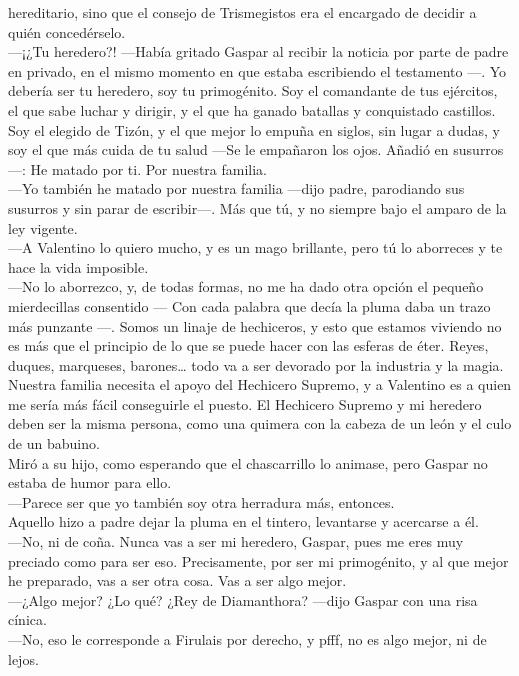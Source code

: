 \documentclass[
  letterpaper,
]{krantz}
\begin{document}
hereditario, sino que el consejo de Trismegistos era el encargado de
decidir a quién concedérselo.\\
---¡¿Tu heredero?! ---Había gritado Gaspar al recibir la noticia por
parte de padre en privado, en el mismo momento en que estaba escribiendo
el testamento ---. Yo debería ser tu heredero, soy tu primogénito. Soy
el comandante de tus ejércitos, el que sabe luchar y dirigir, y el que
ha ganado batallas y conquistado castillos. Soy el elegido de Tizón, y
el que mejor lo empuña en siglos, sin lugar a dudas, y soy el que más
cuida de tu salud ---Se le empañaron los ojos. Añadió en susurros ---:
He matado por ti. Por nuestra familia.\\
---Yo también he matado por nuestra familia ---dijo padre, parodiando
sus susurros y sin parar de escribir---. Más que tú, y no siempre bajo
el amparo de la ley vigente.\\
---A Valentino lo quiero mucho, y es un mago brillante, pero tú lo
aborreces y te hace la vida imposible.\\
---No lo aborrezco, y, de todas formas, no me ha dado otra opción el
pequeño mierdecillas consentido --- Con cada palabra que decía la pluma
daba un trazo más punzante ---. Somos un linaje de hechiceros, y esto
que estamos viviendo no es más que el principio de lo que se puede hacer
con las esferas de éter. Reyes, duques, marqueses, barones\ldots{} todo
va a ser devorado por la industria y la magia. Nuestra familia necesita
el apoyo del Hechicero Supremo, y a Valentino es a quien me sería más
fácil conseguirle el puesto. El Hechicero Supremo y mi heredero deben
ser la misma persona, como una quimera con la cabeza de un león y el
culo de un babuino.\\
Miró a su hijo, como esperando que el chascarrillo lo animase, pero
Gaspar no estaba de humor para ello.\\
---Parece ser que yo también soy otra herradura más, entonces.\\
Aquello hizo a padre dejar la pluma en el tintero, levantarse y
acercarse a él.\\
---No, ni de coña. Nunca vas a ser mi heredero, Gaspar, pues me eres muy
preciado como para ser eso. Precisamente, por ser mi primogénito, y al
que mejor he preparado, vas a ser otra cosa. Vas a ser algo mejor.\\
---¿Algo mejor? ¿Lo qué? ¿Rey de Diamanthora? ---dijo Gaspar con una
risa cínica.\\
---No, eso le corresponde a Firulais por derecho, y pfff, no es algo
mejor, ni de lejos.\\
\end{document}
